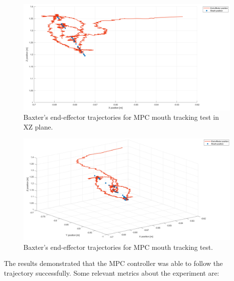 \documentclass[11pt]{report} %
\begin{document}
\begin{figure}[H]
    \centering
    \includegraphics[width=1.0\linewidth]{assets/imgs/control_theory/mpc_tracking/xz_view.png}
    \caption{Baxter's end-effector trajectories for MPC mouth tracking test in XZ plane.} 
    \label{fig_xz_view_mpc_tracking_experiments}
\end{figure}

\begin{figure}[H]
    \centering
    \includegraphics[width=1.0\linewidth]{assets/imgs/control_theory/mpc_tracking/general_view.png}
    \caption{Baxter's end-effector trajectories for MPC mouth tracking test.} 
    \label{fig_general_view_mpc_tracking_experiments}
\end{figure}

The results demonstrated that the MPC controller was able to follow the trajectory successfully. Some relevant metrics about the experiment are:
\end{document}

